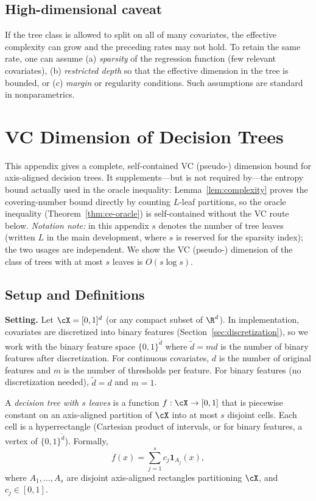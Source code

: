 \documentclass[12pt]{article}
\begin{document}
\subsection{High-dimensional caveat}
If the tree class is allowed to split on all of many covariates, the effective complexity can grow and the preceding rates may not hold. To retain the same rate, one can assume (a) \emph{sparsity} of the regression function (few relevant covariates), (b) \emph{restricted depth} so that the effective dimension in the tree is bounded, or (c) \emph{margin} or regularity conditions. Such assumptions are standard in nonparametrics.

\section{VC Dimension of Decision Trees}
\label{app:vc-dimension}

This appendix gives a complete, self-contained VC (pseudo-) dimension bound for
axis-aligned decision trees. It supplements---but is not required by---the
entropy bound actually used in the oracle inequality: Lemma~\ref{lem:complexity}
proves the covering-number bound directly by counting $L$-leaf partitions, so
the oracle inequality (Theorem~\ref{thm:ce-oracle}) is self-contained without the
VC route below. \emph{Notation note:} in this appendix $s$ denotes the number of
tree leaves (written $L$ in the main development, where $s$ is reserved for the
sparsity index); the two usages are independent. We show the VC (pseudo-)
dimension of the class of trees with at most $s$ leaves is $O(s \log s)$.

\subsection{Setup and Definitions}

\noindent\textbf{Setting.}
Let $\cX = [0,1]^d$ (or any compact subset of $\R^d$). In implementation, covariates are discretized into binary features (Section~\ref{sec:discretization}), so we work with the binary feature space $\{0,1\}^{\tilde{d}}$ where $\tilde{d} = md$ is the number of binary features after discretization. For continuous covariates, $d$ is the number of original features and $m$ is the number of thresholds per feature. For binary features (no discretization needed), $\tilde{d} = d$ and $m = 1$.

A \emph{decision tree with $s$ leaves} is a function $f: \cX \to [0,1]$ that is piecewise constant on an axis-aligned partition of $\cX$ into at most $s$ disjoint cells. Each cell is a hyperrectangle (Cartesian product of intervals, or for binary features, a vertex of $\{0,1\}^{\tilde{d}}$). Formally,
\[
f(x) = \sum_{j=1}^s c_j \mathbf{1}_{A_j}(x),
\]
where $A_1, \ldots, A_s$ are disjoint axis-aligned rectangles partitioning $\cX$, and $c_j \in [0,1]$.
\end{document}
